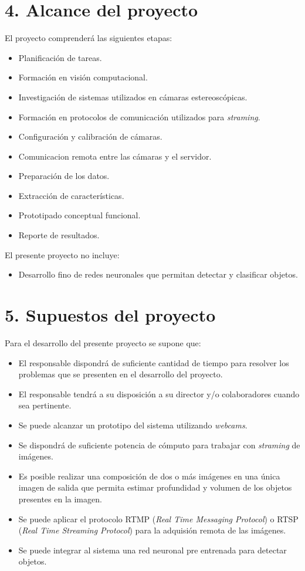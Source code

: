 \documentclass[
11pt, %
]{charter}
\begin{document}
\section{4. Alcance del proyecto}
\label{sec:alcance}
El proyecto comprenderá las siguientes etapas:
\begin{itemize}
\item Planificación de tareas.
\item Formación en visión computacional.
\item Investigación de sistemas utilizados en cámaras estereoscópicas.
\item Formación en protocolos de comunicación utilizados para \emph{straming}.
\item Configuración y calibración de cámaras.
\item Comunicacion remota entre las cámaras y el servidor.
\item Preparación de los datos.
\item Extracción de características.
\item Prototipado conceptual funcional.
\item Reporte de resultados.
\end{itemize}


El presente proyecto no incluye:
\begin{itemize}
\item Desarrollo fino de redes neuronales que permitan detectar y clasificar objetos.
\end{itemize}


\section{5. Supuestos del proyecto}
\label{sec:supuestos}
Para el desarrollo del presente proyecto se supone que:
\begin{itemize}
	\item El responsable dispondrá de suficiente cantidad de tiempo para resolver los problemas que se presenten en el desarrollo del proyecto.
	\item El responsable tendrá a su disposición a su director y/o colaboradores cuando sea pertinente.
	\item Se puede alcanzar un prototipo del sistema utilizando \emph{webcams}.
	\item Se dispondrá de suficiente potencia de cómputo para trabajar con \emph{straming} de imágenes.
	\item Es posible realizar una composición de dos o más imágenes en una única imagen de salida que permita estimar profundidad y volumen de los objetos presentes en la imagen. 
	\item Se puede aplicar el protocolo RTMP (\emph{Real Time Messaging Protocol}) o RTSP (\emph{Real Time Streaming Protocol}) para la adquisión remota de las imágenes.
	\item Se puede integrar al sistema una red neuronal pre entrenada para detectar objetos.
\end{itemize}
\end{document}
